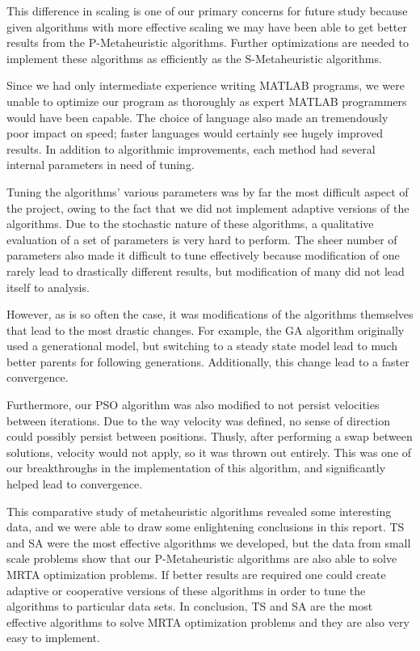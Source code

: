 \documentclass[a4paper]{article}
\begin{document}
This difference in scaling is one of our primary concerns for future study because given algorithms with more effective scaling we may have been able to get better results from the P-Metaheuristic algorithms. Further optimizations are needed to implement these algorithms as efficiently as the S-Metaheuristic algorithms. 

Since we had only intermediate experience writing MATLAB programs, we were unable to optimize our program as thoroughly as expert MATLAB programmers would have been capable. The choice of language also made an tremendously poor impact on speed; faster languages would certainly see hugely improved results. In addition to algorithmic improvements, each method had several internal parameters in need of tuning.

Tuning the algorithms' various parameters was by far the most difficult aspect of the project, owing to the fact that we did not implement adaptive versions of the algorithms. Due to the stochastic nature of these algorithms, a qualitative evaluation of a set of parameters is very hard to perform. The sheer number of parameters also made it difficult to tune effectively because modification of one rarely lead to drastically different results, but modification of many did not lead itself to analysis.

However, as is so often the case, it was modifications of the algorithms themselves that lead to the most drastic changes. For example, the GA algorithm originally used a generational model, but switching to a steady state model lead to much better parents for following generations. Additionally, this change lead to a faster convergence. 

Furthermore, our PSO algorithm was also modified to not persist velocities between iterations. Due to the way velocity was defined, no sense of direction could possibly persist between positions. Thusly, after performing a swap between solutions, velocity would not apply, so it was thrown out entirely. This was one of our breakthroughs in the implementation of this algorithm, and significantly helped lead to convergence.

This comparative study of metaheuristic algorithms revealed some interesting data, and we were able to draw some enlightening conclusions in this report. TS and SA were the most effective algorithms we developed, but the data from small scale problems show that our P-Metaheuristic algorithms are also able to solve MRTA optimization problems.  If better results are required one could create adaptive or cooperative versions of these algorithms in order to tune the algorithms to particular data sets. In conclusion, TS and SA are the most effective algorithms to solve MRTA optimization problems and they are also very easy to implement.

\printbibliography
\end{document}
